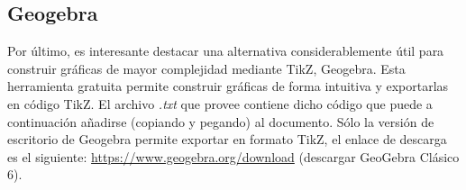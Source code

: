 \documentclass[a4paper, 11pt, spanish, twoside]{article}
\begin{document}
\subsection{Geogebra}

Por último, es interesante destacar una alternativa considerablemente útil para construir gráficas de mayor complejidad mediante TikZ, Geogebra. Esta herramienta gratuita permite construir gráficas de forma intuitiva y exportarlas en código TikZ. El archivo \textit{.txt} que provee contiene dicho código que puede a continuación añadirse (copiando y pegando) al documento. Sólo la versión de escritorio de Geogebra permite exportar en formato TikZ, el enlace de descarga es el siguiente: \url{https://www.geogebra.org/download} (descargar GeoGebra Clásico 6).

\vspace{6pt}
\end{document}

